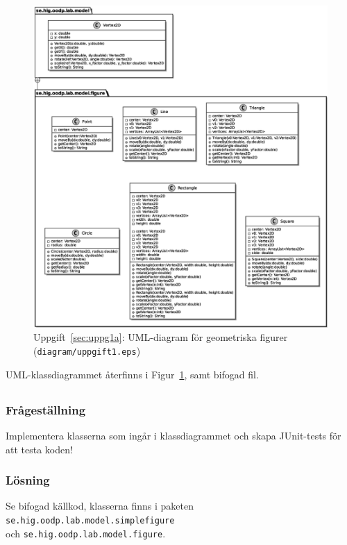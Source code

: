\begin{figure}[htbp]
\centering
\includegraphics[width=\linewidth]{diagram/uppgift1.eps}
\caption{Uppgift~\ref{sec:uppg1a}: UML-diagram för geometriska figurer
(\texttt{diagram/uppgift1.eps})}
\label{fig:uppg1a}
\end{figure}

\par UML-klassdiagrammet återfinns i Figur~\ref{fig:uppg1a}, samt bifogad fil.


\subsection{}\label{uppg1b}
\subsubsection*{Frågeställning}
Implementera klasserna som ingår i klassdiagrammet och skapa JUnit-tests för
att testa koden!

\subsubsection*{Lösning}
Se bifogad källkod, klasserna finns i paketen
\texttt{se.hig.oodp.lab.model.simplefigure} \\ och 
\texttt{se.hig.oodp.lab.model.figure}.



